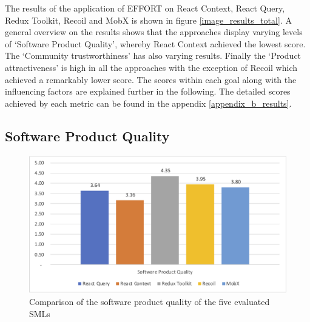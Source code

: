The results of the application of EFFORT on React Context, React Query,
Redux Toolkit, Recoil and MobX is shown in figure \ref{image_results_total}. A general
overview on the results shows that the approaches display varying levels
of `Software Product Quality', whereby React Context achieved the lowest
score. The `Community trustworthiness' has also varying results. Finally
the `Product attractiveness' is high in all the approaches with the
exception of Recoil which achieved a remarkably lower score. The scores
within each goal along with the influencing factors are explained further
in the following. The detailed scores achieved by each metric can be
found in the appendix \ref{appendix_b_results}.

\hypertarget{software-product-quality}{%
    \subsection{Software Product
    Quality}\label{software-product-quality}}

\begin{figure}
    \centering
    \includegraphics{images/chart_quality}
    \caption{Comparison of the software product quality of the five evaluated SMLs}
    \label{image_results_quality_general}
\end{figure}


